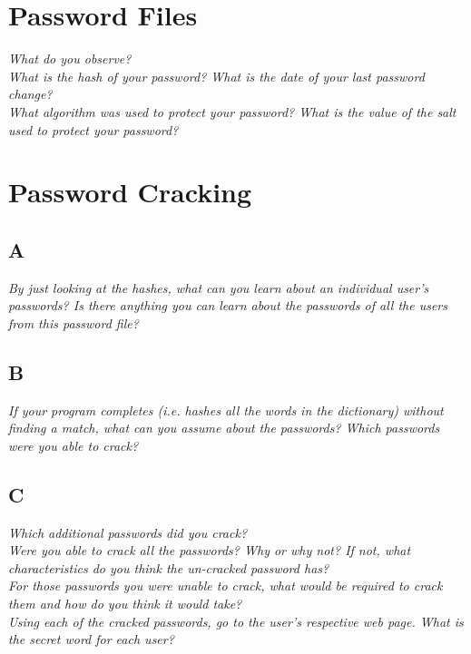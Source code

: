 \section{Password Files}

\textit{What do you observe?}\\

\textit{What is the hash of your password? What is the date of your last password change?}\\

\textit{What algorithm was used to protect your password? What is the value of the salt used to protect your password?}\\


\section{Password Cracking}

\subsection{A}

\textit{By just looking at the hashes, what can you learn about an individual user’s passwords? Is there anything you can learn about the passwords of all the users from this password file?}\\



\subsection{B}

\textit{If your program completes (i.e. hashes all the words in the dictionary) without finding a match, what can you assume about the passwords? Which passwords were you able to crack?}\\



\subsection{C}

\textit{Which additional passwords did you crack?}\\


\textit{Were you able to crack all the passwords? Why or why not? If not, what characteristics do you think the un-cracked password has?}\\


\textit{For those passwords you were unable to crack, what would be required to crack them and how do you think it would take?}\\


\textit{Using each of the cracked passwords, go to the user's respective web page. What is the secret word for each user?}\\

